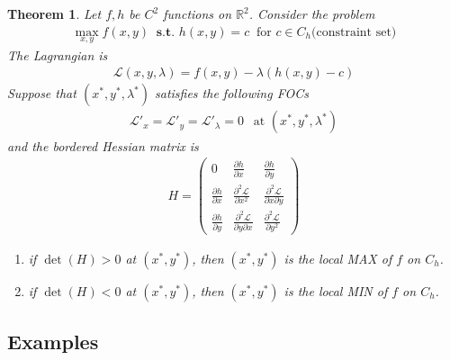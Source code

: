 \documentclass[11pt,a4paper]{book}
\newtheorem{theorem}{Theorem}[section]
\theoremstyle{definition}\newtheorem{definition}{Definition}
\theoremstyle{definition}\newtheorem{fact}{Fact}
\theoremstyle{definition}\newtheorem{remark}{Remark}
\theoremstyle{definition}\newtheorem{ex}{Ex.}
\theoremstyle{definition}\newtheorem{project}{Project}
\theoremstyle{definition}\newtheorem{problem}{Problem}
\theoremstyle{definition}\newtheorem{example}{Example}
\newenvironment{ftheorem}
{\begin{mdframed}\begin{theorem}}
		{\end{theorem}\end{mdframed}}
\numberwithin{theorem}{section}
\numberwithin{corollary}{chapter}
\numberwithin{assumption}{chapter}
\numberwithin{definition}{chapter}
\numberwithin{prop}{chapter}
\numberwithin{notation}{chapter}
\numberwithin{problem}{chapter}
\numberwithin{example}{chapter}
\numberwithin{fact}{chapter}
\numberwithin{ex}{chapter}
\def\R{\mathbb R}
\def\R{\mathbb R}
\begin{document}
	\begin{ftheorem}
		Let $f,h$ be $C^2$ functions on $\R^2$. Consider the problem
		\begin{align*}
			\max_{x,y} f(x,y) \ \textbf{ s.t. } h(x,y) = c  \ \text{ for } c \in C_h \text{(constraint set)} 
		\end{align*}
		The Lagrangian is
		\begin{align*}
			\mathcal{L}(x,y,\lambda) = f(x,y) - \lambda (h(x,y) - c) 
		\end{align*}
		Suppose that $(x^*, y^*, \lambda^*)$ satisfies the following FOCs
		\begin{align*}
			\mathcal{L}'_x = \mathcal{L}'_y = \mathcal{L}'_\lambda = 0 \ \ \text{ at $(x^*,y^*,\lambda^*)$} 
		\end{align*}
		and the bordered Hessian matrix is
		\begin{align*}
			H = \begin{pmatrix}
				0                             & \frac{\partial h}{\partial x}                        & \frac{\partial h}{\partial y}                        \\
				\frac{\partial h}{\partial x} & \frac{\partial^2 \mathcal{L}}{\partial x^2}          & \frac{\partial^2 \mathcal{L}}{\partial x \partial y} \\
				\frac{\partial h}{\partial y} & \frac{\partial^2 \mathcal{L}}{\partial y \partial x} & \frac{\partial^2 \mathcal{L}}{\partial y^2}          
			\end{pmatrix}
		\end{align*}
		\begin{enumerate}
			\item 		if $\det(H) > 0$ at $(x^*, y^*)$, then $(x^*, y^*)$ is the local MAX of $f$ on $C_h$.
			\item 		if $\det(H) < 0$ at $(x^*, y^*)$, then $(x^*, y^*)$ is the local MIN of $f$ on $C_h$.
		\end{enumerate}
	\end{ftheorem}
	
	\subsection{Examples}
	
\end{document}
